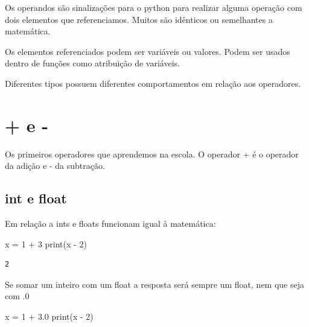 \documentclass[
  letterpaper,
  DIV=11,
  numbers=noendperiod]{scrreprt}
\newenvironment{Shaded}{\begin{snugshade}}{\end{snugshade}}
\newcommand{\BuiltInTok}[1]{\textcolor[rgb]{0.00,0.23,0.31}{#1}}
\newcommand{\DecValTok}[1]{\textcolor[rgb]{0.68,0.00,0.00}{#1}}
\newcommand{\FloatTok}[1]{\textcolor[rgb]{0.68,0.00,0.00}{#1}}
\newcommand{\NormalTok}[1]{\textcolor[rgb]{0.00,0.23,0.31}{#1}}
\newcommand{\OperatorTok}[1]{\textcolor[rgb]{0.37,0.37,0.37}{#1}}
\begin{document}
Os operandos são sinalizações para o python para realizar alguma
operação com dois elementos que referenciamos. Muitos são idênticos ou
semelhantes a matemática.

Os elementos referenciados podem ser variáveis ou valores. Podem ser
usados dentro de funções como atribuição de variáveis.

Diferentes tipos possuem diferentes comportamentos em relação aos
operadores.

\hypertarget{e--}{%
\section{+ e -}\label{e--}}

Os primeiros operadores que aprendemos na escola. O operador + é o
operador da adição e - da subtração.

\hypertarget{int-e-float}{%
\subsection{int e float}\label{int-e-float}}

Em relação a ints e floats funcionam igual à matemática:

\begin{Shaded}
\begin{Highlighting}[]
\NormalTok{x }\OperatorTok{=} \DecValTok{1} \OperatorTok{+} \DecValTok{3}
\BuiltInTok{print}\NormalTok{(x }\OperatorTok{{-}} \DecValTok{2}\NormalTok{)}
\end{Highlighting}
\end{Shaded}

\begin{tcolorbox}[enhanced jigsaw, breakable, leftrule=.75mm, left=2mm, opacityback=0, bottomrule=.15mm, toprule=.15mm, rightrule=.15mm, arc=.35mm, colback=white]

\begin{verbatim}
2
\end{verbatim}

\end{tcolorbox}

Se somar um inteiro com um float a resposta será sempre um float, nem
que seja com .0

\begin{Shaded}
\begin{Highlighting}[]
\NormalTok{x }\OperatorTok{=} \DecValTok{1} \OperatorTok{+} \FloatTok{3.0}
\BuiltInTok{print}\NormalTok{(x }\OperatorTok{{-}} \DecValTok{2}\NormalTok{)}
\end{Highlighting}
\end{Shaded}
\end{document}

